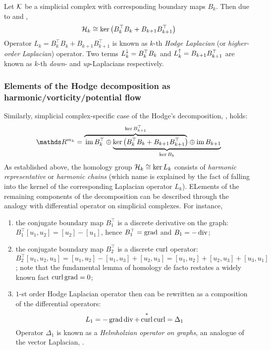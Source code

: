 \begin{definition}
      Let \( \mathcal{K} \) be a simplicial complex with corresponding boundary maps \( B_k \). Then due to  and ,
      \begin{equation}
            \mathcal{H}_k \cong \ker \left( B_k^\top B_k + B_{k+1} B_{k+1}^\top \right)
      \end{equation}
      Operator \( L_k =  B_k^\top B_k + B_{k+1} B_{k+1}^\top \) is known as \(k\)-th \emph{Hodge Laplacian} (or \emph{higher-order Laplacian}) operator. Two terms \( L_{k}^{\downarrow} =B_k^\top B_k  \) and \( L_{k}^{\uparrow} = B_{k+1} B_{k+1}^\top \) are known as \(k\)-th \emph{down}- and \emph{up}-Laplacians respectively.
\end{definition}


\subsubsection{ Elements of the Hodge decomposition as harmonic/vorticity/potential flow}

Similarly, simplicial complex-specific case of the Hodge's decomposition, , holds:
\begin{equation}
      \ds R^{m_k} = \lefteqn{\overbrace{\phantom{\im B_k^\top \oplus  \ker \left( B_k^\top B_k + B_{k+1} B_{k+1}^\top \right)}}^{\ker B_{k+1}^\top}} \im B_k^\top \oplus
      \underbrace{\ker \left( B_k^\top B_k + B_{k+1} B_{k+1}^\top \right) \oplus  \im B_{k+1}}_{\ker B_k}            
\end{equation}
As established above, the homology group \( \mathcal{H}_k \cong \ker L_k \) consists of \emph{harmonic representative} or \emph{harmonic chains} (which name is explained by the fact of falling into the kernel of the corresponding Laplacian operator \( L_k \)). ELements of the remaining components of the decomposition can be described through the analogy with differential operator on simplicial complexes. For instance, 
\begin{enumerate}
      \item the conjugate boundary map \( B_1^\top \) is a discrete derivative on the graph: \( B_1^\top  [u_1, u_2 ] = [ u_2 ] - [u_1]\), hence \( B_1^\top  = \operatorname*{\mathrm{grad}} \) and \( B_1 =  -\operatorname*{\mathrm{div}} \);
      \item the conjugate boundary map \( B_2^\top \) is a discrete \( \operatorname*{\mathrm{curl}} \) operator: \( B_2^\top [u_1, u_2, u_3 ] = [u_1, u_2] - [u_1, u_3]+[u_2, u_3] = [u_1, u_2] +[u_2, u_3] + [u_3, u_1]\); note that the fundamental lemma of homology de facto restates a widely known fact \( \operatorname*{\mathrm{curl}} \operatorname*{\mathrm{grad}} = 0 \);
      \item \(1\)-st order Hodge Laplacian operator then can be rewritten as a composition of the differential operators:
      \begin{equation}
            L_1 = - \operatorname*{\mathrm{grad}} \operatorname*{\mathrm{div}} + \operatorname*{\mathrm{curl}}^* \operatorname*{\mathrm{curl}} = \Delta_1
      \end{equation}
      Operator \( \Delta_1 \) is known as a \emph{Helmholzian operator on graphs}, an analogue of the vector Laplacian, \cite{hanlonLaplacianMethod2002}.
\end{enumerate}

